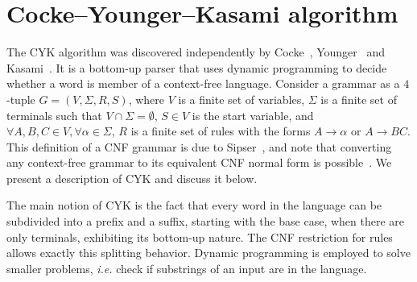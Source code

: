 \documentclass[12pt]{article}
\begin{document}
\section{Cocke–Younger–Kasami algorithm}\label{sec:cyk}

The CYK algorithm was discovered independently by Cocke~\cite{Cocke:book:1970},
Younger~\cite{Younger:article:1967:feb} and
Kasami~\cite{Kasami:report:1966:mar}. It is a bottom-up parser that uses
dynamic programming to decide whether a word is member of a context-free
language. Consider a grammar as a $4$-tuple $G = (V, \Sigma, R, S)$, where $V$
is a finite set of variables, $\Sigma$ is a finite set of terminals such that
$V \cap \Sigma = \emptyset$, $S \in V$ is the start variable, and $\forall A,
B, C \in V, \forall \alpha \in \Sigma$, $R$ is a finite set of rules with the
forms $A \rightarrow \alpha$ or $A \rightarrow BC$. This definition of a CNF
grammar is due to Sipser~\cite{Sipser:book:2006}, and note that converting any
context-free grammar to its equivalent CNF normal form is
possible~\cite[Theorem 2.9]{Sipser:book:2006}. We present a description of CYK
and discuss it below.

The main notion of CYK is the fact that every word in the language can be
subdivided into a prefix and a suffix, starting with the base case, when there
are only terminals, exhibiting its bottom-up nature. The CNF restriction for
rules allows exactly this splitting behavior. Dynamic programming is employed
to solve smaller problems, \emph{i.e.} check if substrings of an input are in
the language.
\end{document}
